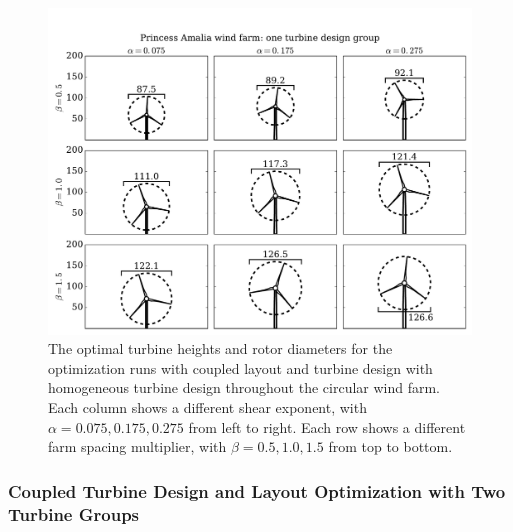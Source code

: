 \begin{figure}[htbp]
  \centering
  \includegraphics[trim={0.5cm 0.3cm 0.3cm 1.75cm},clip,width=\textwidth]{Figures/turbineSizesAmalia_1.pdf}
  \caption{\label{amalia_turbines_1} The optimal turbine heights and rotor diameters for the optimization runs with coupled layout and turbine design with homogeneous turbine design throughout the circular wind farm. Each column shows a different shear exponent, with $\alpha=0.075,0.175,0.275$ from left to right. Each row shows a different farm spacing multiplier, with $\beta=0.5,1.0,1.5$ from top to bottom.}
\end{figure}



\subsubsection{Coupled Turbine Design and Layout Optimization with Two Turbine Groups}

